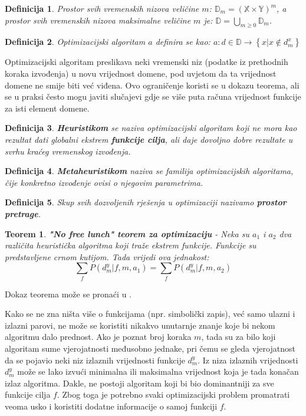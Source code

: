 \documentclass[times, utf8, diplomski, numeric]{fer}
\newtheorem{definition}{Definicija}
\newtheorem{theorem}{Teorem}
\begin{document}
\begin{definition}
Prostor svih vremenskih nizova veličine $m$: $\mathbb{D}_m = (\mathbb{X} \times \mathbb{Y})^m$, a prostor svih vremenskih nizova maksimalne veličine $m$ je: $\mathbb{D} = \bigcup_{m\ge0}\mathbb{D}_m$.
\end{definition}

\begin{definition}
Optimizacijski algoritam $a$ definira se kao: $a : d \in \mathbb{D} \rightarrow \left \{x | x \notin d_m^x \right \}$
\end{definition}

Optimizacijski algoritam preslikava neki vremenski niz (podatke iz prethodnih koraka izvođenja) u novu vrijednost domene, pod uvjetom da ta vrijednost domene ne smije biti već viđena. Ovo ograničenje koristi se u dokazu teorema, ali se u praksi često mogu javiti slučajevi gdje se više puta računa vrijednost funkcije za isti element domene.

\begin{definition}
\textbf{Heuristikom} se naziva optimizacijski algoritam koji ne mora kao rezultat dati globalni ekstrem \textbf{funkcije cilja}, ali daje dovoljno dobre rezultate u svrhu kraćeg vremenskog izvođenja. 
\end{definition}

\begin{definition}
\textbf{Metaheuristikom} naziva se familija optimizacijskih algoritama, čije konkretno izvođenje ovisi o njegovim parametrima.
\end{definition}

\begin{definition}
Skup svih dozvoljenih rješenja u optimizaciji nazivamo \textbf{prostor pretrage}.
\end{definition}

\begin{theorem}
\label{thm:nofreelunch}
\textbf{"No free lunch" teorem za optimizaciju} - Neka su $a_1$ i $a_2$ dva različita heuristička algoritma koji traže ekstrem funkcije. Funkcije su predstavljene crnom kutijom. Tada vrijedi ova jednakost:
\begin{equation}
	\sum_{f}P(d_m^y|f,m,a_1) = \sum_{f}P(d_m^y|f,m,a_2)
\end{equation}
\end{theorem}

Dokaz teorema može se pronaći u \cite{lit15}.

Kako se ne zna ništa više o funkcijama (npr. simbolički zapis), već samo ulazni i izlazni parovi, ne može se koristiti nikakvo unutarnje znanje koje bi nekom algoritmu dalo prednost. Ako je poznat broj koraka $m$, tada su za bilo koji algoritam sume vjerojatnosti međusobno jednake, pri čemu se gleda vjerojatnost da se pojavio neki niz izlaznih vrijednosti funkcije $d_m^y$.
Iz niza izlaznih vrijednosti $d_m^y$ može se lako izvući minimalna ili maksimalna vrijednost koja je tada konačan izlaz algoritma. Dakle, ne postoji algoritam koji bi bio dominantniji za sve funkcije cilja $f$. Zbog toga je potrebno svaki optimizacijski problem promatrati veoma usko i koristiti dodatne informacije o samoj funkciji $f$.
\end{document}
